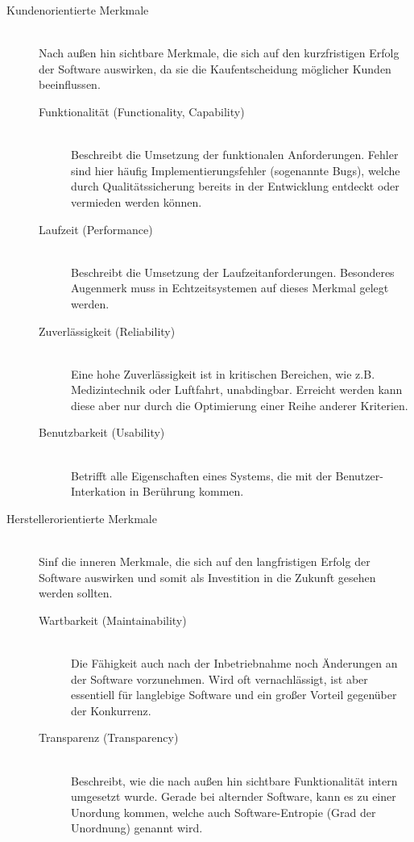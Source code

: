 \begin{description}
  \item[Kundenorientierte Merkmale] \hfill \\ Nach außen hin sichtbare Merkmale, die sich auf den kurzfristigen Erfolg der Software auswirken, da sie die Kaufentscheidung möglicher Kunden beeinflussen.
  \begin{description}
    \item[Funktionalität (Functionality, Capability)] \hfill \\ Beschreibt die Umsetzung der funktionalen Anforderungen. Fehler sind hier häufig Implementierungsfehler (sogenannte Bugs), welche durch Qualitätssicherung bereits in der Entwicklung entdeckt oder vermieden werden können. 
    \item[Laufzeit (Performance)] \hfill \\ Beschreibt die Umsetzung der Laufzeitanforderungen. Besonderes Augenmerk muss in Echtzeitsystemen auf dieses Merkmal gelegt werden.
    \item[Zuverlässigkeit (Reliability)] \hfill \\ Eine hohe Zuverlässigkeit ist in kritischen Bereichen, wie z.B. Medizintechnik oder Luftfahrt, unabdingbar. Erreicht werden kann diese aber nur durch die Optimierung einer Reihe anderer Kriterien.
    \item[Benutzbarkeit (Usability)] \hfill \\ Betrifft alle Eigenschaften eines Systems, die mit der Benutzer-Interkation in Berührung kommen.
  \end{description}
  \item[Herstellerorientierte Merkmale] \hfill \\ Sinf die inneren Merkmale, die sich auf den langfristigen Erfolg der Software auswirken und somit als Investition in die Zukunft gesehen werden sollten.
  \begin{description}
    \item[Wartbarkeit (Maintainability)] \hfill \\ Die Fähigkeit auch nach der Inbetriebnahme noch Änderungen an der Software vorzunehmen. Wird oft vernachlässigt, ist aber essentiell für langlebige Software und ein großer Vorteil gegenüber der Konkurrenz.
    \item[Transparenz (Transparency)] \hfill \\ Beschreibt, wie die nach außen hin sichtbare Funktionalität intern umgesetzt wurde. Gerade bei alternder Software, kann es zu einer Unordung kommen, welche auch Software-Entropie (Grad der Unordnung) genannt wird.

\end{description}
\end{description}
